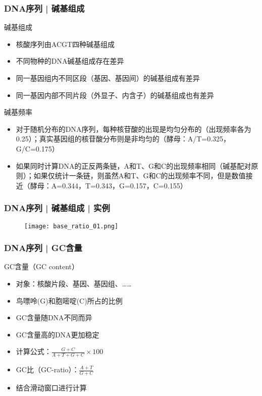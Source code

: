 \begin{frame}
  \frametitle{DNA序列 | 碱基组成}
  \begin{block}{碱基组成}
  \begin{itemize}
    \item 核酸序列由ACGT四种碱基组成
    \item 不同物种的DNA碱基组成存在差异
    \item 同一基因组内不同区段（基因、基因间）的碱基组成有差异
    \item 同一基因内部不同片段（外显子、内含子）的碱基组成也有差异
  \end{itemize}
  \end{block}
  \vspace{-0.3em}
  \pause
  \begin{block}{碱基频率}
  \begin{itemize}
    \item 对于随机分布的DNA序列，每种核苷酸的出现是均匀分布的（出现频率各为0.25）；真实基因组的核苷酸分布则是非均匀的（酵母：A/T=0.325，G/C=0.175）
    \item 如果同时计算DNA的正反两条链，A和T、G和C的出现频率相同（碱基配对原则）；如果仅统计一条链，则虽然A和T、G和C的出现频率不同，但是数值接近（酵母：A=0.344，T=0.343，G=0.157，C=0.155）
  \end{itemize}
  \end{block}
\end{frame}

\begin{frame}
  \frametitle{DNA序列 | 碱基组成 | 实例}
  \begin{figure}
    \centering
    \texttt{[image: base\_ratio\_01.png]}
  \end{figure}
\end{frame}

\begin{frame}
  \frametitle{DNA序列 | GC含量}
  \begin{block}{GC含量（GC content）}
    \begin{itemize}
      \item 对象：核酸片段、基因、基因组、……
      \item 鸟嘌呤(G)和胞嘧啶(C)所占的比例
      \item GC含量随DNA不同而异
      \item GC含量高的DNA更加稳定
      \item 计算公式：$\frac{G+C}{A+T+G+C}\times100$
      \item GC比（GC-ratio）：$\frac{A+T}{G+C}$
      \item 结合滑动窗口进行计算
    \end{itemize}
  \end{block}
\end{frame}

